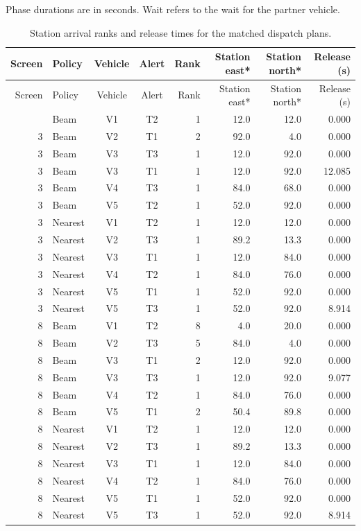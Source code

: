 \noindent Phase durations are in seconds. Wait refers to the wait for the partner vehicle.\par
{}
\begin{longtable}{@{}rlccrrrr@{}}
\caption{Station arrival ranks and release times for the matched dispatch plans.}\\
\toprule
Screen & Policy & Vehicle & Alert & Rank & Station east* & Station north* & Release (s)\\
\midrule
\endfirsthead
\toprule
Screen & Policy & Vehicle & Alert & Rank & Station east* & Station north* & Release (s)\\
\midrule
\endhead
\bottomrule
\endlastfoot
3 & Beam & V1 & T2 & 1 & 12.0 & 12.0 & 0.000\\
3 & Beam & V2 & T1 & 2 & 92.0 & 4.0 & 0.000\\
3 & Beam & V3 & T3 & 1 & 12.0 & 92.0 & 0.000\\
3 & Beam & V3 & T1 & 1 & 12.0 & 92.0 & 12.085\\
3 & Beam & V4 & T3 & 1 & 84.0 & 68.0 & 0.000\\
3 & Beam & V5 & T2 & 1 & 52.0 & 92.0 & 0.000\\
3 & Nearest & V1 & T2 & 1 & 12.0 & 12.0 & 0.000\\
3 & Nearest & V2 & T3 & 1 & 89.2 & 13.3 & 0.000\\
3 & Nearest & V3 & T1 & 1 & 12.0 & 84.0 & 0.000\\
3 & Nearest & V4 & T2 & 1 & 84.0 & 76.0 & 0.000\\
3 & Nearest & V5 & T1 & 1 & 52.0 & 92.0 & 0.000\\
3 & Nearest & V5 & T3 & 1 & 52.0 & 92.0 & 8.914\\
8 & Beam & V1 & T2 & 8 & 4.0 & 20.0 & 0.000\\
8 & Beam & V2 & T3 & 5 & 84.0 & 4.0 & 0.000\\
8 & Beam & V3 & T1 & 2 & 12.0 & 92.0 & 0.000\\
8 & Beam & V3 & T3 & 1 & 12.0 & 92.0 & 9.077\\
8 & Beam & V4 & T2 & 1 & 84.0 & 76.0 & 0.000\\
8 & Beam & V5 & T1 & 2 & 50.4 & 89.8 & 0.000\\
8 & Nearest & V1 & T2 & 1 & 12.0 & 12.0 & 0.000\\
8 & Nearest & V2 & T3 & 1 & 89.2 & 13.3 & 0.000\\
8 & Nearest & V3 & T1 & 1 & 12.0 & 84.0 & 0.000\\
8 & Nearest & V4 & T2 & 1 & 84.0 & 76.0 & 0.000\\
8 & Nearest & V5 & T1 & 1 & 52.0 & 92.0 & 0.000\\
8 & Nearest & V5 & T3 & 1 & 52.0 & 92.0 & 8.914\\
\end{longtable}
